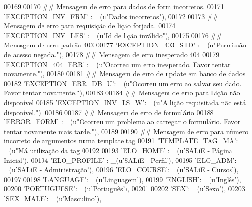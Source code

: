 \begin{DoxyCode}
00169 
00170     \textcolor{comment}{## Mensagem de erro para dados de form incorretos.}
00171     \textcolor{stringliteral}{'EXCEPTION\_INV\_FRM'} : \_(\textcolor{stringliteral}{u"Dados incorretos"}),
00172 
00173     \textcolor{comment}{## Mensagem de erro para requisição de lição forjada.}
00174     \textcolor{stringliteral}{'EXCEPTION\_INV\_LES'} : \_(\textcolor{stringliteral}{u"Id de lição inválido"}),
00175 
00176     \textcolor{comment}{## Mensagem de erro padrão 403}
00177     \textcolor{stringliteral}{'EXCEPTION\_403\_STD'} : \_(\textcolor{stringliteral}{u"Permissão de acesso negada."}),
00178     \textcolor{comment}{## Mensagem de erro inesperado 404}
00179     \textcolor{stringliteral}{'EXCEPTION\_404\_ERR'} : \_(\textcolor{stringliteral}{u"Ocorreu um erro inesperado. Favor tentar novamente."}),
00180 
00181     \textcolor{comment}{## Mensagem de erro de update em banco de dados}
00182     \textcolor{stringliteral}{'EXCEPTION\_ERR\_DB\_U'}: \_(\textcolor{stringliteral}{u"Ocorreu um erro ao salvar seu dado. Favor tentar novamente."}),
00183 
00184     \textcolor{comment}{## Mensagem de erro para Lição não disponível}
00185     \textcolor{stringliteral}{'EXCEPTION\_INV\_LS\_W'}: \_(\textcolor{stringliteral}{u"A lição requisitada não está disponível."}),
00186 
00187     \textcolor{comment}{## Mensagem de erro de formulário}
00188     \textcolor{stringliteral}{'ERROR\_FORM'}  : \_(\textcolor{stringliteral}{u"Ocorreu um problema ao carregar o formulário. Favor tentar novamente mais tarde."}),
00189 
00190     \textcolor{comment}{## Mensagem de erro para número incorreto de argumentos numa template tag}
00191     \textcolor{stringliteral}{'TEMPLATE\_TAG\_MA'}: \_(\textcolor{stringliteral}{u"Má utilização da tag %
00192     
00193     \textcolor{stringliteral}{'ELO\_HOME'} : \_(\textcolor{stringliteral}{u'SALiE - Página Inicial'}),
00194     \textcolor{stringliteral}{'ELO\_PROFILE'} : \_(\textcolor{stringliteral}{u'SALiE - Perfil'}),
00195     \textcolor{stringliteral}{'ELO\_ADM'}: \_(\textcolor{stringliteral}{u'SALiE - Administração'}),
00196     \textcolor{stringliteral}{'ELO\_COURSE'}: \_(\textcolor{stringliteral}{u'SALiE - Cursos'}),
00197 
00198     \textcolor{stringliteral}{'LANGUAGE'}: \_(\textcolor{stringliteral}{u'Linguagem'}),
00199     \textcolor{stringliteral}{'ENGLISH'}: \_(\textcolor{stringliteral}{u'Inglês'}),
00200     \textcolor{stringliteral}{'PORTUGUESE'}: \_(\textcolor{stringliteral}{u'Português'}),
00201 
00202     \textcolor{stringliteral}{'SEX'}: \_(\textcolor{stringliteral}{u'Sexo'}),
00203     \textcolor{stringliteral}{'SEX\_MALE'}: \_(\textcolor{stringliteral}{u'Masculino'}),
}
\end{DoxyCode}
